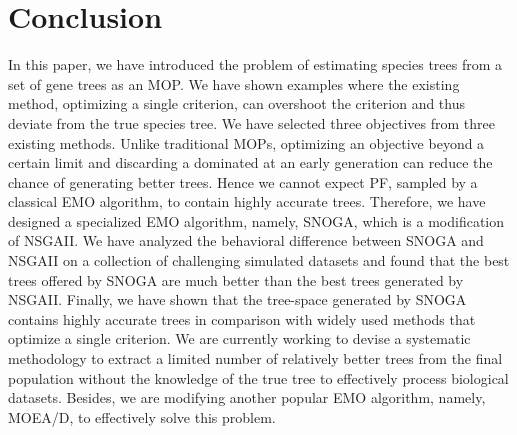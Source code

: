 \section{Conclusion} %
In this paper, we have introduced the problem of estimating species trees from a set of gene trees as an MOP. We have shown examples where the existing method, optimizing a single criterion, can overshoot the criterion and thus deviate from the true species tree. We have selected three objectives from three existing methods. Unlike traditional MOPs, optimizing an objective beyond a certain limit and discarding a dominated at an early generation can reduce the chance of generating better trees. Hence we cannot expect PF, sampled by a classical EMO algorithm, to contain highly accurate trees. Therefore, we have designed a specialized EMO algorithm, namely, SNOGA, which is a modification of NSGAII. %
We have analyzed the behavioral difference between SNOGA and NSGAII on a collection of challenging simulated datasets and found that the best trees offered by SNOGA are much better than the best trees generated by NSGAII. Finally, we have shown that the tree-space generated by SNOGA contains highly accurate trees in comparison with widely used methods that optimize a single criterion. We are currently working to devise a systematic methodology to extract a limited number of relatively better trees from the final population without the knowledge of the true tree to effectively process biological datasets. Besides, we are modifying another popular EMO algorithm, namely, MOEA/D, to effectively solve this problem.




